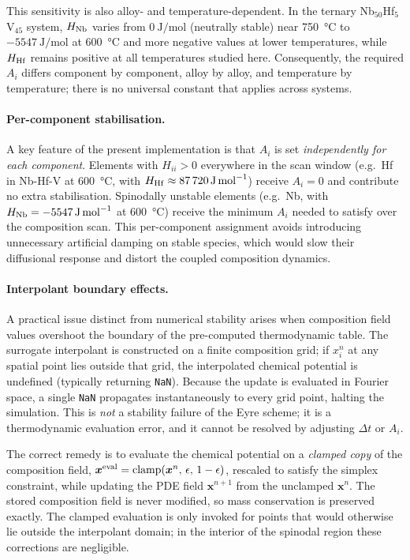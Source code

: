 {This sensitivity is also alloy- and temperature-dependent.  In the
ternary Nb$_{50}$Hf$_5$V$_{45}$ system, $H_{\rm Nb}$ varies from
$\SI{0}{\joule\per\mol}$ (neutrally stable) near \SI{750}{\celsius}
to $\SI{-5547}{\joule\per\mol}$ at \SI{600}{\celsius} and more
negative values at lower temperatures, while $H_{\rm Hf}$ remains
positive at all temperatures studied here.  Consequently, the required
$A_i$ differs component by component, alloy by alloy, and temperature
by temperature; there is no universal constant that applies across
systems.

\paragraph{Per-component stabilisation.}

A key feature of the present implementation is that $A_i$ is set
\emph{independently for each component}.  Elements with $H_{ii} > 0$
everywhere in the scan window (e.g.\ Hf in Nb-Hf-V at
\SI{600}{\celsius}, with $H_{\rm Hf} \approx \SI{+87720}{\joule\per\mol}$)
receive $A_i = 0$ and contribute no extra stabilisation.
Spinodally unstable elements (e.g.\ Nb, with
$H_{\rm Nb} = \SI{-5547}{\joule\per\mol}$ at \SI{600}{\celsius})
receive the minimum $A_i$ needed to satisfy
 over the composition scan.  This
per-component assignment avoids introducing unnecessary artificial
damping on stable species, which would slow their diffusional response
and distort the coupled composition dynamics.

\paragraph{Interpolant boundary effects.}

A practical issue distinct from numerical stability arises when
composition field values overshoot the boundary of the pre-computed
thermodynamic table.  The surrogate interpolant is constructed on a
finite composition grid; if $x_i^n$ at any spatial point lies outside
that grid, the interpolated chemical potential is undefined (typically
returning \texttt{NaN}).  Because the update 
is evaluated in Fourier space, a single \texttt{NaN} propagates
instantaneously to every grid point, halting the simulation.  This is
\emph{not} a stability failure of the Eyre scheme; it is a thermodynamic evaluation error, and it cannot be resolved by adjusting
$\Delta t$ or $A_i$.

The correct remedy is to evaluate the chemical potential on a
\emph{clamped copy} of the composition field,
$\boldsymbol{x}^{\rm eval} = \mathrm{clamp}(\boldsymbol{x}^n,\,\epsilon,\,1-\epsilon)$,
rescaled to satisfy the simplex constraint,
while updating the PDE field $\boldsymbol{x}^{n+1}$ from the
unclamped $\boldsymbol{x}^n$.  The stored composition field is never
modified, so mass conservation is preserved exactly.  The clamped
evaluation is only invoked for points that would otherwise lie outside
the interpolant domain; in the interior of the spinodal region these
corrections are negligible.

}

